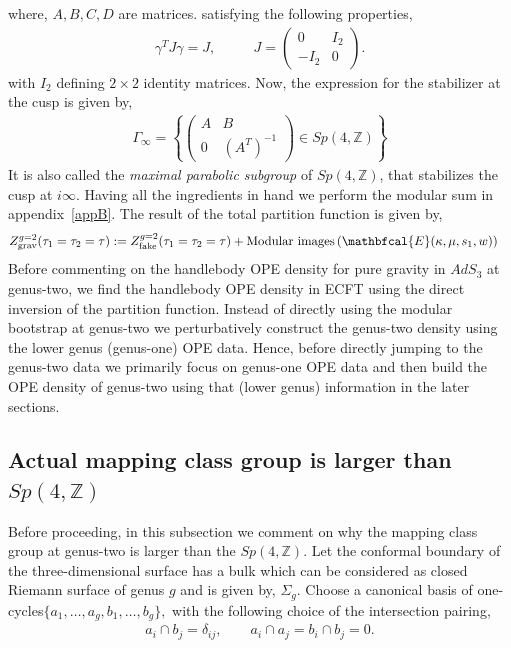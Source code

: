 \documentclass[12 pt]{article}
\begin{document}
where, $A,B,C,D$ are matrices. satisfying the following properties,\begin{align}
    \gamma^{T}J\gamma=J, \qquad\,\,\,\,J=\begin{pmatrix}
    0 & I_2\\
    -I_2& 0
\end{pmatrix}.
\end{align}
with $I_2$ defining $2\times 2$ identity matrices. Now, the expression for the stabilizer at the cusp is given by,
\begin{align}
    \Gamma_{\infty}=\left\{\begin{pmatrix}
    A & B\\
    0& (A^{T})^{-1}
\end{pmatrix}\in Sp(4,\mathbb{Z})\right\}
\end{align}
It is also called the \textit{maximal parabolic subgroup} of $Sp(4,\mathbb{Z})$, that stabilizes the cusp at $i\infty$. Having all the ingredients in hand we perform the modular sum in appendix~\ref{appB}.
The result of the total partition function is given by,
\begin{align}
\begin{split}
     Z_{\textrm{grav}}^{g=2}(\tau_1=\tau_2=\tau)&:=  Z_{\textrm{fake}}^{g=2}(\tau_1=\tau_2=\tau)+\text{Modular images\,} (\mathbfcal{E}(\kappa,\mu,s_1,w))
     \end{split}
\end{align}
\noindent
Before commenting on the handlebody OPE density for pure gravity in $AdS_3$ at genus-two, we find the handlebody OPE density in ECFT using the direct inversion of the partition function. Instead of directly using the modular bootstrap at genus-two we perturbatively construct the genus-two density using the lower genus (genus-one) OPE data. Hence, before directly jumping to the genus-two data we primarily focus on genus-one OPE data and then build the OPE density of genus-two using that (lower genus) information in the later sections.
\subsection{Actual mapping class group is larger than $Sp(4,\mathbb{Z})$}
Before proceeding, in this subsection we comment on why the mapping class group at genus-two is larger than the $Sp(4,\mathbb{Z})$. 
Let the conformal boundary of the three-dimensional surface has a bulk which can be considered as closed Riemann surface of genus $g$ and is given by, $\Sigma_g.$ Choose a canonical basis of one-cycles$
\{a_1,\ldots,a_g,b_1,\ldots,b_g\},
$
with the following choice of the intersection pairing,
\begin{align}
    a_i\cap b_j=\delta_{ij},
\qquad
a_i\cap a_j=b_i\cap b_j=0.
\end{align}
\end{document}
